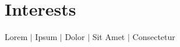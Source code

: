 
\section{Interests}
\begin{itemize}[leftmargin=0.15in, label={}]
  \small{\item{
        Lorem $|$ Ipsum $|$ Dolor $|$ Sit Amet $|$ Consectetur
        }}
\end{itemize}
